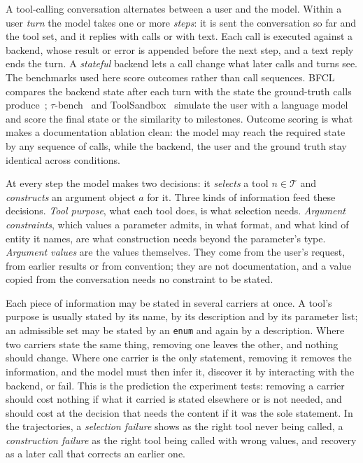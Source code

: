 \documentclass[10pt]{article}
\makeatletter
\renewcommand\subsection{\@startsection{subsection}{2}{\z@}{-2.6ex plus -.6ex minus -.2ex}{0.8ex plus .2ex}{\normalfont\normalsize\bfseries}}
\newcommand{\code}[1]{\texttt{#1}}
\newcommand{\toolset}{\mathcal{T}}
\makeatother
\begin{document}
A tool-calling conversation alternates between a user and the model. Within a user \emph{turn} the model takes one or more \emph{steps}: it is sent the conversation so far and the tool set, and it replies with calls or with text. Each call is executed against a backend, whose result or error is appended before the next step, and a text reply ends the turn. A \emph{stateful} backend lets a call change what later calls and turns see. The benchmarks used here score outcomes rather than call sequences. BFCL compares the backend state after each turn with the state the ground-truth calls produce~\citep{mao2024bfclv3}; $\tau$-bench~\citep{yao2025taubench} and ToolSandbox~\citep{lu2024toolsandbox} simulate the user with a language model and score the final state or the similarity to milestones. Outcome scoring is what makes a documentation ablation clean: the model may reach the required state by any sequence of calls, while the backend, the user and the ground truth stay identical across conditions.

\subsection{Two decisions and what they need}\label{sec:bg-decisions}

At every step the model makes two decisions: it \emph{selects} a tool $n \in \toolset$ and \emph{constructs} an argument object $a$ for it. Three kinds of information feed these decisions. \emph{Tool purpose}, what each tool does, is what selection needs. \emph{Argument constraints}, which values a parameter admits, in what format, and what kind of entity it names, are what construction needs beyond the parameter's type. \emph{Argument values} are the values themselves. They come from the user's request, from earlier results or from convention; they are not documentation, and a value copied from the conversation needs no constraint to be stated.

Each piece of information may be stated in several carriers at once. A tool's purpose is usually stated by its name, by its description and by its parameter list; an admissible set may be stated by an \code{enum} and again by a description. Where two carriers state the same thing, removing one leaves the other, and nothing should change. Where one carrier is the only statement, removing it removes the information, and the model must then infer it, discover it by interacting with the backend, or fail. This is the prediction the experiment tests: removing a carrier should cost nothing if what it carried is stated elsewhere or is not needed, and should cost at the decision that needs the content if it was the sole statement. In the trajectories, a \emph{selection failure} shows as the right tool never being called, a \emph{construction failure} as the right tool being called with wrong values, and recovery as a later call that corrects an earlier one.
\end{document}
